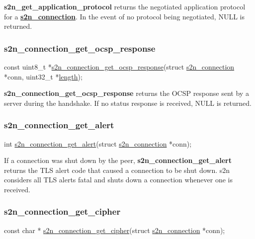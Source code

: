 {\bfseries s2n\+\_\+get\+\_\+application\+\_\+protocol} returns the negotiated application protocol for a {\bfseries \hyperlink{structs2n__connection}{s2n\+\_\+connection}}. In the event of no protocol being negotiated, N\+U\+LL is returned.

\subsubsection*{s2n\+\_\+connection\+\_\+get\+\_\+ocsp\+\_\+response}


\begin{DoxyCode}
\textcolor{keyword}{const} uint8\_t *\hyperlink{s2n_8h_a2b18cd3437636a7a21e10f3d5d09ff9d}{s2n\_connection\_get\_ocsp\_response}(\textcolor{keyword}{struct} 
      \hyperlink{structs2n__connection}{s2n\_connection} *conn, uint32\_t *\hyperlink{crypto_2asn1_2asn1_8h_a5a2d57a92488e64c730cabc247c9d5b5}{length});
\end{DoxyCode}


{\bfseries s2n\+\_\+connection\+\_\+get\+\_\+ocsp\+\_\+response} returns the O\+C\+SP response sent by a server during the handshake. If no status response is received, N\+U\+LL is returned.

\subsubsection*{s2n\+\_\+connection\+\_\+get\+\_\+alert}


\begin{DoxyCode}
\textcolor{keywordtype}{int} \hyperlink{s2n_8h_a6726a1cbae275671f2751ac610dc5f0f}{s2n\_connection\_get\_alert}(\textcolor{keyword}{struct} \hyperlink{structs2n__connection}{s2n\_connection} *conn);
\end{DoxyCode}


If a connection was shut down by the peer, {\bfseries s2n\+\_\+connection\+\_\+get\+\_\+alert} returns the T\+LS alert code that caused a connection to be shut down. s2n considers all T\+LS alerts fatal and shuts down a connection whenever one is received.

\subsubsection*{s2n\+\_\+connection\+\_\+get\+\_\+cipher}


\begin{DoxyCode}
\textcolor{keyword}{const} \textcolor{keywordtype}{char} * \hyperlink{s2n_8h_a119c0252cf7edde4d4a5c65f8cd23721}{s2n\_connection\_get\_cipher}(\textcolor{keyword}{struct} 
      \hyperlink{structs2n__connection}{s2n\_connection} *conn);
\end{DoxyCode}


